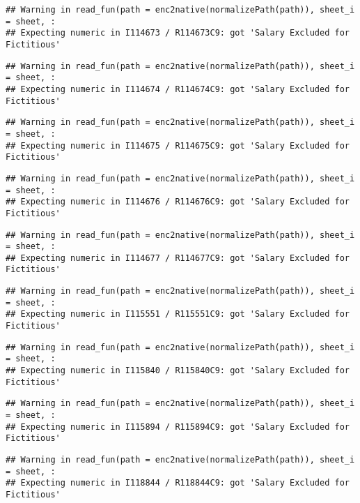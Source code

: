 \documentclass[
]{article}
\begin{document}
\begin{verbatim}
## Warning in read_fun(path = enc2native(normalizePath(path)), sheet_i = sheet, :
## Expecting numeric in I114673 / R114673C9: got 'Salary Excluded for Fictitious'
\end{verbatim}

\begin{verbatim}
## Warning in read_fun(path = enc2native(normalizePath(path)), sheet_i = sheet, :
## Expecting numeric in I114674 / R114674C9: got 'Salary Excluded for Fictitious'
\end{verbatim}

\begin{verbatim}
## Warning in read_fun(path = enc2native(normalizePath(path)), sheet_i = sheet, :
## Expecting numeric in I114675 / R114675C9: got 'Salary Excluded for Fictitious'
\end{verbatim}

\begin{verbatim}
## Warning in read_fun(path = enc2native(normalizePath(path)), sheet_i = sheet, :
## Expecting numeric in I114676 / R114676C9: got 'Salary Excluded for Fictitious'
\end{verbatim}

\begin{verbatim}
## Warning in read_fun(path = enc2native(normalizePath(path)), sheet_i = sheet, :
## Expecting numeric in I114677 / R114677C9: got 'Salary Excluded for Fictitious'
\end{verbatim}

\begin{verbatim}
## Warning in read_fun(path = enc2native(normalizePath(path)), sheet_i = sheet, :
## Expecting numeric in I115551 / R115551C9: got 'Salary Excluded for Fictitious'
\end{verbatim}

\begin{verbatim}
## Warning in read_fun(path = enc2native(normalizePath(path)), sheet_i = sheet, :
## Expecting numeric in I115840 / R115840C9: got 'Salary Excluded for Fictitious'
\end{verbatim}

\begin{verbatim}
## Warning in read_fun(path = enc2native(normalizePath(path)), sheet_i = sheet, :
## Expecting numeric in I115894 / R115894C9: got 'Salary Excluded for Fictitious'
\end{verbatim}

\begin{verbatim}
## Warning in read_fun(path = enc2native(normalizePath(path)), sheet_i = sheet, :
## Expecting numeric in I118844 / R118844C9: got 'Salary Excluded for Fictitious'
\end{verbatim}
\end{document}
